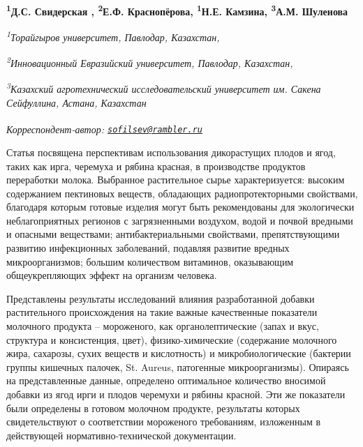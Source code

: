
\begin{articleheader}

{\bfseries
\textsuperscript{1}Д.С. Свидерская\textsuperscript{\envelope } ,
\textsuperscript{2}Е.Ф. Краснопёрова,
\textsuperscript{1}Н.Е. Камзина,
\textsuperscript{3}А.М. Шуленова}
\end{articleheader}

\begin{affiliation}
\emph{\textsuperscript{1}Торайгыров университет, Павлодар, Казахстан,}

\emph{\textsuperscript{2}Инновационный Евразийский университет, Павлодар, Казахстан,}

\emph{\textsuperscript{3}Казахский агротехнический исследовательский университет им. Сакена Сейфуллина, Астана, Казахстан}

\raggedright \textsuperscript{\envelope }{\em Корреспондент-автор: \href{mailto:sofilsev@rambler.ru}{\nolinkurl{sofilsev@rambler.ru}}}
\end{affiliation}

Статья посвящена перспективам использования дикорастущих плодов и ягод,
таких как ирга, черемуха и рябина красная, в производстве продуктов
переработки молока. Выбранное растительное сырье характеризуется:
высоким содержанием пектиновых веществ, обладающих радиопротекторными
свойствами, благодаря которым готовые изделия могут быть рекомендованы
для экологически неблагоприятных регионов с загрязненными воздухом,
водой и почвой вредными и опасными веществами; антибактериальными
свойствами, препятствующими развитию инфекционных заболеваний, подавляя
развитие вредных микроорганизмов; большим количеством витаминов,
оказывающим общеукрепляющих эффект на организм человека.

Представлены результаты исследований влияния разработанной добавки
растительного происхождения на такие важные качественные показатели
молочного продукта -- мороженого, как органолептические (запах и вкус,
структура и консистенция, цвет), физико-химические (содержание молочного
жира, сахарозы, сухих веществ и кислотность) и микробиологические
(бактерии группы кишечных палочек, St. Aureus, патогенные
микроорганизмы). Опираясь на представленные данные, определено
оптимальное количество вносимой добавки из ягод ирги и плодов черемухи и
рябины красной. Эти же показатели были определены в готовом молочном
продукте, результаты которых свидетельствуют о соответствии мороженого
требованиям, изложенным в действующей нормативно-технической
документации.

